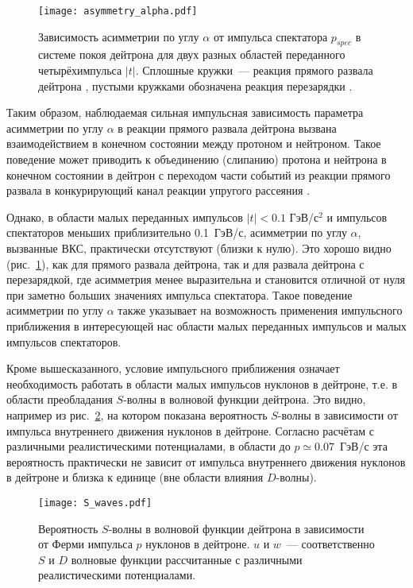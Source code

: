 \begin{figure}[hp]
  \centering
  \texttt{[image: asymmetry\_alpha.pdf]}
  \caption{Зависимость асимметрии по углу $\alpha$ от импульса спектатора
    $p_{spec}$ в системе покоя дейтрона для двух разных областей переданного
    четырёхимпульса $|t|$. Сплошные кружки~--- реакция прямого развала дейтрона
    \dpret, пустыми кружками обозначена реакция перезарядки \dpchex.}
  \label{fig:asymmetry_alpha}
\end{figure}

Таким образом, наблюдаемая сильная импульсная зависимость параметра асимметрии
по углу $\alpha$ в реакции прямого развала дейтрона вызвана взаимодействием в
конечном состоянии между протоном и нейтроном. Такое поведение может приводить
к объединению (слипанию) протона и нейтрона в конечном состоянии в дейтрон с
переходом части событий из реакции прямого развала \dpret в конкурирующий канал
реакции упругого рассеяния \dpela.

Однако, в области малых переданных импульсов $|t| < 0.1$ ГэВ/с$^2$ и импульсов
спектаторов меньших приблизительно 0.1~ГэВ/с, асимметрии по углу $\alpha$,
вызванные ВКС, практически отсутствуют (близки к нулю). Это хорошо видно
(рис.~\ref{fig:asymmetry_alpha}), как для прямого развала дейтрона, так и для
развала дейтрона с перезарядкой, где асимметрия менее выразительна и становится
отличной от нуля при заметно больших значениях импульса спектатора. Такое
поведение асимметрии по углу $\alpha$ также указывает на возможность применения
импульсного приближения в интересующей нас области малых переданных импульсов и
малых импульсов спектаторов.

Кроме вышесказанного, условие импульсного приближения означает необходимость
работать в области малых импульсов нуклонов в дейтроне, т.е. в области
преобладания $S$-волны в волновой функции дейтрона. Это видно, например из
рис.~\ref{fig:S_waves}, на котором показана вероятность $S$-волны в зависимости
от импульса внутреннего движения нуклонов в дейтроне. Согласно расчётам с
различными реалистическими потенциалами, в области до $p \simeq 0.07$~ГэВ/с
эта вероятность практически не зависит от импульса внутреннего движения нуклонов
в дейтроне и близка к единице (вне области влияния $D$-волны).

\begin{figure}[h]
  \centering
  \texttt{[image: S\_waves.pdf]}
  \caption{Вероятность $S$-волны в волновой функции дейтрона в зависимости от
    Ферми импульса $p$ нуклонов в дейтроне. $u$ и $w$~--- соответственно $S$ и
    $D$ волновые функции рассчитанные с различными реалистическими
    потенциалами.}
  \label{fig:S_waves}
\end{figure}


